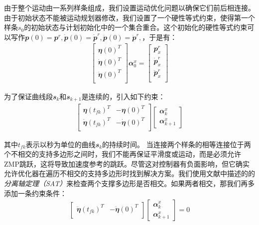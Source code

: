由于整个运动由一系列样条组成，我们设置运动优化问题以确保它们前后相连接。由于初始状态不能被运动规划器修改，我们设置了一个硬性等式约束，使得第一个样条$s_0$的初始状态与计划初始化中的一个集合重合。这个初始化的硬性等式约束可以写作$\mathbfit{p}(0)=\mathbfit{p}^r,\mathbfit{\dot p}(0)=\mathbfit{\dot p}^r,\mathbfit{\ddot p}(0)=\mathbfit{\ddot p}^r,$，于是有：
\begin{align}
    \begin{bmatrix}
        \mathbfit{\eta}(0)^T\\
        \mathbfit{\dot \eta}(0)^T\\
        \mathbfit{\ddot \eta}(0)^T\\
    \end{bmatrix} \mathbfit{\alpha}_0^x=
    \begin{bmatrix}
        \mathbfit{p}_x^r\\
        \mathbfit{\dot p}_x^r\\
        \mathbfit{\ddot p}_x^r\\
    \end{bmatrix}
\end{align}

为了保证曲线段$\mathbfit{s}_k$和$\mathbfit{s}_{k+1}$是连续的，引入如下约束：
\begin{align}
    \begin{bmatrix}
        \mathbfit{\eta}(t_{fk})^T & -\mathbfit{\eta}(0)^T\\
        \mathbfit{\dot \eta}(t_{fk})^T & -\mathbfit{\dot \eta}(0)^T\\
    \end{bmatrix} 
    \begin{bmatrix}
        \mathbfit{\alpha}_k^x\\
        \mathbfit{\alpha}_{k+1}^x
    \end{bmatrix}
\end{align}

其中$t_{fk}$表示以秒为单位的曲线$\mathbfit{s}_k$的持续时间。
当连接两个样条的相等连接位于两个不相交的支持多边形之间时，我们不能再保证平滑度或运动，而是必须允许ZMP跳跃，这将导致加速度参考的跳跃。尽管这对控制器有负面影响，但它确实允许优化器在遍历不相交的支持多边形时找到解决方案。我们使用文献\cite{}中描述的的\emph{分离轴定理（SAT）}来检查两个支撑多边形是否相交。如果两者相交，那我们再多添加一条约束条件：
\begin{align}
    \begin{bmatrix}
        \mathbfit{\ddot \eta}(t_{fk})^T & -\mathbfit{\ddot \eta}(0)^T\\
    \end{bmatrix} 
    \begin{bmatrix}
        \mathbfit{\alpha}_k^x\\
        \mathbfit{\alpha}_{k+1}^x
    \end{bmatrix}=0
\end{align}


